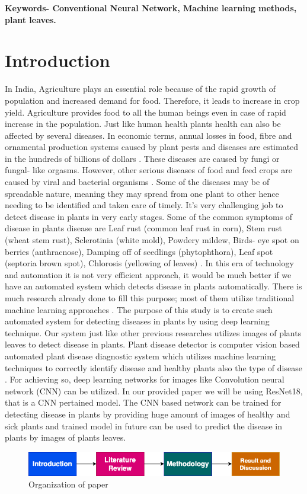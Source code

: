 \documentclass[conference]{IEEEtran}
\begin{document}
\textbf{\small{\textbf{Keywords- Conventional Neural Network, Machine learning methods, plant leaves.}}
}

\section{\textbf{Introduction}}
In India, Agriculture plays an essential role because of the rapid growth of population and increased demand for food. Therefore, it leads to increase in crop yield. Agriculture provides food to all the human beings even in case of rapid increase in the population. Just like human health plants health can also be affected by several diseases. In economic terms, annual losses in food, fibre and ornamental production systems caused by plant pests and diseases are estimated in the hundreds of billions of dollars \cite{r3}. These diseases are caused by fungi or fungal- like orgasms. However, other serious diseases of food and feed crops are caused by viral and bacterial organisms \cite{r4}. Some of the diseases may be of spreadable nature, meaning they may spread from one plant to other hence needing to be identified and taken care of timely. It’s very challenging job to detect disease in plants in very
 early stages. Some of the common symptoms of disease in plants disease are Leaf rust (common leaf rust in corn), Stem rust (wheat stem rust), Sclerotinia (white mold), Powdery mildew, Birds- eye spot on berries (anthracnose), Damping off of seedlings (phytophthora), Leaf spot (septoria brown spot), Chlorosis (yellowing of leaves) . In this era of technology and automation it is not very efficient approach, it would be much better if we have an automated system which detects disease in plants automatically. There is much research already done to fill this purpose; most of them utilize traditional machine learning approaches \cite{r5}. The purpose of this study is to create such automated system for detecting diseases in plants by using deep learning technique. Our system just like other previous researches utilizes images of plants leaves to detect disease in plants. Plant disease detector is computer vision based automated plant disease diagnostic system which utilizes machine learning techniques to correctly identify disease and healthy plants also the type of disease . For achieving so, deep learning networks for images like Convolution neural network (CNN) can be utilized. In our provided paper we will be using ResNet18, that is a CNN pertained model. The CNN based network can be trained for detecting disease in plants by providing huge amount of images of healthy and sick plants and trained model in future can be used to predict the disease in plants by images of plants leaves.
\begin{figure}
    \centering
    \includegraphics[width=1\linewidth]{paperflow.drawio.png}
    \caption{Organization of paper}
    \label{fig:enter-label}
\end{figure}
\end{document}
